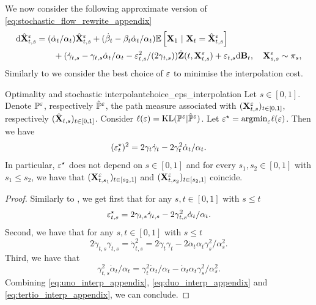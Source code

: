 \documentclass{article}
\begin{document}
We now consider the following approximate version of \eqref{eq:stochastic_flow_rewrite_appendix}
\begin{align}
    \rmd \hat{\bfX}_{t,s}^\vareps &= (\dot{\alpha}_t/\alpha_t) \hat{\bfX}_{t,s}^\vareps + (\dot{\beta}_t - \beta_t \dot{\alpha}_t / \alpha_t) \mathbb{E}\left[\bfX_1 \ | \ \bfX_t = \hat{\bfX}_{t,s}^\vareps\right] \\
    &\qquad + (\dot{\gamma}_{t,s} - \gamma_{t,s} \dot{\alpha}_t/\alpha_t -  \vareps_{t,s}^2 /(2\gamma_{t,s})) \hat{\bfZ}(t, \bfX_{t,s}^\vareps) + \vareps_{t,s} \rmd \bfB_t , \quad \bfX_{s,s}^\vareps \sim \pi_s ,
\label{eq:stochastic_flow_rewrite_appendix_approximate}
\end{align}
Similarly to  we consider the best choice of $\varepsilon$ to minimise the interpolation cost. 
\begin{proposition}{Optimality and stochastic interpolant}{choice_eps_interpolation}
Let $s \in [0,1]$. Denote $\mathbb{P}^\varepsilon$, respectively $\hat{\mathbb{P}}^\varepsilon$, the path measure associated with $(\mathbf{X}_{t,s}^\varepsilon)_{t \in [0,1]}$, respectively $(\hat{\mathbf{X}}_{t,s})_{t \in [0,1]}$. 
Consider $\ell(\varepsilon) = \mathrm{KL}( \mathbb{P}^\varepsilon | \hat{\mathbb{P}}^\varepsilon)$. Let $\varepsilon^\star = \mathrm{argmin}_\varepsilon \ell(\varepsilon)$. Then we have 
\begin{equation}
    (\varepsilon^\star_t)^2 = 2 \gamma_t \dot{\gamma}_t - 2 \gamma_t^2 \dot{\alpha}_t/\alpha_t .
\end{equation}
In particular, $\varepsilon^\star$ does not depend on $s \in [0,1]$ and for every $s_1, s_2 \in [0,1]$ with $s_1 \leq s_2$, we have that $(\mathbf{X}_{t,s_1}^\varepsilon)_{t \in [s_2, 1]}$ and $(\mathbf{X}_{t,s_2}^\varepsilon)_{t \in [s_2, 1]}$ coincide.
\end{proposition}

\begin{proof}
Similarly to , we get first that 
for any $s, t \in [0,1]$ with $s \leq t$
\begin{equation}
\label{eq:uno_interp_appendix}
    \vareps_{t,s}^\star = 2 \gamma_{t,s} \dot{\gamma}_{t,s} - 2 \gamma_{t,s}^2 \dot{\alpha}_t/\alpha_t .
\end{equation}
Second, we have that for any $s, t \in [0,1]$ with $s \leq t$
\begin{equation}
\label{eq:duo_interp_appendix}
    2 \dot{\gamma}_{t,s} \gamma_{t,s} = \dot{\gamma}^2_{t,s}  = 2 \dot{\gamma}_t \gamma_t - 2 \dot{\alpha}_t \alpha_t \gamma_s^2 / \alpha_s^2 . 
\end{equation}
Third, we have that 
\begin{equation}
\label{eq:tertio_interp_appendix}
    \gamma_{t,s}^2 \dot{\alpha}_t / \alpha_t = \gamma_t^2 \dot{\alpha}_t / \alpha_t - \dot{\alpha}_t \alpha_t \gamma_s^2 / \alpha_s^2 . 
\end{equation}
Combining \eqref{eq:uno_interp_appendix}, \eqref{eq:duo_interp_appendix} and \eqref{eq:tertio_interp_appendix}, we can conclude. 
\end{proof}
\end{document}
